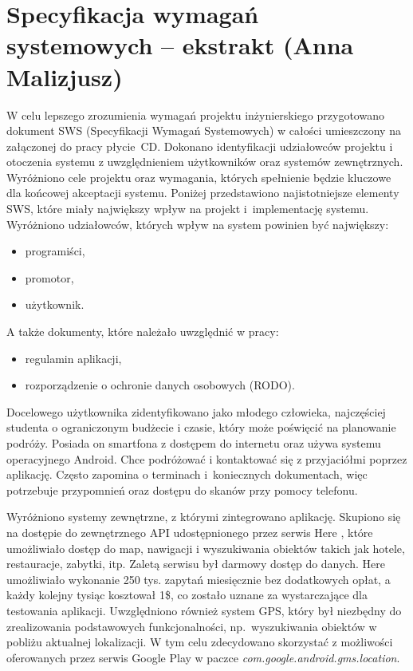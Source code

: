 \documentclass[10pt,twoside,a4paper]{report}
\begin{document}
\chapter{Specyfikacja wymagań systemowych -- ekstrakt (Anna Malizjusz)}
\par W celu lepszego zrozumienia wymagań projektu inżynierskiego przygotowano dokument SWS (Specyfikacji Wymagań Systemowych) w całości umieszczony na załączonej do pracy płycie~CD. Dokonano identyfikacji udziałowców projektu i otoczenia systemu z uwzględnieniem użytkowników oraz systemów zewnętrznych. Wyróżniono cele projektu oraz wymagania, których spełnienie będzie kluczowe dla końcowej akceptacji systemu. Poniżej przedstawiono najistotniejsze elementy SWS, które miały największy wpływ na projekt i~implementację systemu.
\newline
\newline
\noindent Wyróżniono udziałowców, których wpływ na system powinien być największy:

\begin{itemize}
\item programiści,
\item promotor,
\item użytkownik.
\end{itemize}

\noindent A także dokumenty, które należało uwzględnić w pracy:

\begin{itemize}
\item regulamin aplikacji,
\item rozporządzenie o ochronie danych osobowych (RODO).
\end{itemize}

\par Docelowego użytkownika zidentyfikowano jako młodego człowieka, najczęściej studenta o ograniczonym budżecie i czasie, który może poświęcić na planowanie podróży. Posiada on smartfona z dostępem do internetu oraz używa systemu operacyjnego Android. Chce podróżować i kontaktować się z przyjaciółmi poprzez aplikację. Często zapomina o terminach i~koniecznych dokumentach, więc potrzebuje przypomnień oraz dostępu do skanów przy pomocy telefonu.

\par Wyróżniono systemy zewnętrzne, z którymi zintegrowano aplikację. Skupiono się na dostępie do zewnętrznego API udostępnionego przez serwis Here \cite{Here}, które umożliwiało dostęp do map, nawigacji i wyszukiwania obiektów takich jak hotele, restauracje, zabytki, itp. Zaletą serwisu był darmowy dostęp do danych. Here umożliwiało wykonanie 250 tys. zapytań miesięcznie bez dodatkowych opłat, a każdy kolejny tysiąc kosztował 1\$, co zostało uznane za wystarczające dla testowania aplikacji. Uwzględniono również system GPS, który był niezbędny do zrealizowania podstawowych funkcjonalności, np.~wyszukiwania obiektów w pobliżu aktualnej lokalizacji. W tym celu zdecydowano skorzystać z możliwości oferowanych przez serwis Google Play w paczce \textit{com.google.android.gms.location}\cite{gms.location}.
\end{document}
